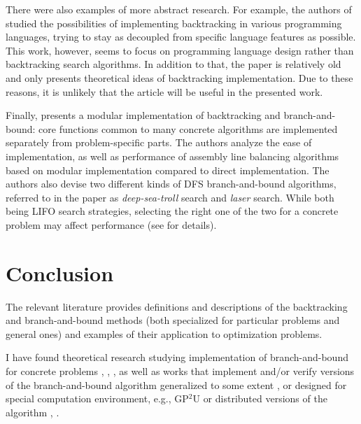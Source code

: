 There were also examples of more abstract research. For example, the
authors of \cite{prenner1972proglangs} studied the possibilities of implementing
backtracking in various programming languages, trying to stay as decoupled from specific language
features as possible. This work, however, seems to focus on programming language design
rather than backtracking search algorithms. In addition to that, the paper is relatively old and
only presents theoretical ideas of backtracking implementation. Due to these reasons, it is unlikely
that the article will be useful in the presented work.

Finally, \cite{johnson1988modular} presents a modular implementation of backtracking and
branch-and-bound: core functions common to many concrete algorithms are implemented separately
from problem-specific parts. The authors analyze the ease of implementation, as well as performance
of assembly line balancing algorithms based on modular implementation compared to direct
implementation. The authors also devise two different kinds of DFS branch-and-bound algorithms,
referred to in the paper as \emph{deep-sea-troll} search and \emph{laser} search. While both
being LIFO search strategies, selecting the right one of the two for a concrete  problem may
affect performance (see \cite{johnson1988modular} for details).

\section{Conclusion}

The relevant literature provides definitions and descriptions of the backtracking and
branch-and-bound methods (both specialized for particular problems and general ones) and
examples of their application to optimization problems.

I have found theoretical research studying implementation
of branch-and-bound for concrete problems
\cite{clausen1999principles}, \cite{bard1990bilevel}, \cite{indriyono2024sudoku},
as well as works that implement and/or verify versions of the branch-and-bound algorithm
generalized to some extent
\cite{narkawicz2013formalnasa}, \cite{johnson1988modular}
or designed for special computation environment, e.g., GP$^2$U \cite{lalami2012gpu} or
distributed versions of the algorithm \cite{smirnov2017concur}, \cite{finkel1987distrib}.

